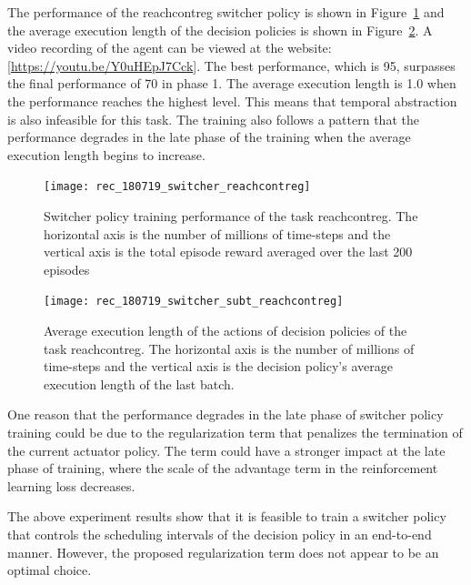 The performance of the reachcontreg switcher policy is shown in Figure~\ref{rec_switcher_reachcontreg} and the average execution length of the decision policies is shown in Figure~\ref{rec_switcher_subt_reachcontreg}. A video recording of the agent can be viewed at the website:  [\url{https://youtu.be/Y0uHEpJ7Cck}]. The best performance, which is 95, surpasses the final performance of 70 in phase 1. The average execution length is 1.0 when the performance reaches the highest level. This means that temporal abstraction is also infeasible for this task. The training also follows a pattern that the performance degrades in the late phase of the training when the average execution length begins to increase.
\begin{figure}[!htbp]
	\centering
	\texttt{[image: rec\_180719\_switcher\_reachcontreg]}
	\caption{Switcher policy training performance of the task reachcontreg. The horizontal axis is the number of millions of time-steps and the vertical axis is the total episode reward averaged over the last 200 episodes}
	\label{rec_switcher_reachcontreg}
\end{figure}

\begin{figure}[!htbp]
	\centering
	\texttt{[image: rec\_180719\_switcher\_subt\_reachcontreg]}
	\caption{Average execution length of the actions of decision policies of the task reachcontreg. The horizontal axis is the number of millions of time-steps and the vertical axis is the decision policy's average execution length of the last batch.}
	\label{rec_switcher_subt_reachcontreg}
\end{figure}

One reason that the performance degrades in the late phase of switcher policy training could be due to the regularization term that penalizes the termination of the current actuator policy. The term could have a stronger impact at the late phase of training, where the scale of the advantage term in the reinforcement learning loss decreases.

The above experiment results show that it is feasible to train a switcher policy that controls the scheduling intervals of the decision policy in an end-to-end manner. However, the proposed regularization term does not appear to be an optimal choice. 